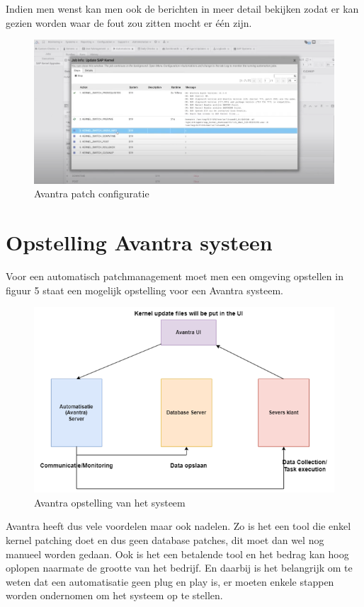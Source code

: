 \documentclass[dutch,dit,thesis]{hogentreport}
\begin{document}
Indien men wenst kan men ook de berichten in meer detail bekijken zodat er kan gezien worden waar de fout zou zitten mocht er één zijn.

\begin{figure}[htbp]
    \centering
    \includegraphics[width=\textwidth]{avantra3.png}
    \caption{Avantra patch configuratie}
     \label{fig:avantra1}
\end{figure}


\section{Opstelling Avantra systeen}
Voor een automatisch patchmanagement moet men een omgeving opstellen in figuur 5 staat een mogelijk opstelling voor een Avantra systeem. 
\begin{figure}[htbp]
    \centering
    \includegraphics[width=\textwidth]{avantra4.png}
    \caption{Avantra opstelling van het systeem}
     \label{fig:avantra1}
\end{figure}


Avantra heeft dus vele voordelen maar ook nadelen. Zo is het een tool die enkel kernel patching doet en dus geen database patches, dit moet dan wel nog manueel worden gedaan. Ook is het een betalende tool en het bedrag kan hoog oplopen naarmate de grootte van het bedrijf.
En daarbij is het belangrijk om te weten dat een automatisatie geen plug en play is, er moeten enkele stappen worden ondernomen om het systeem op te stellen.
\end{document}
